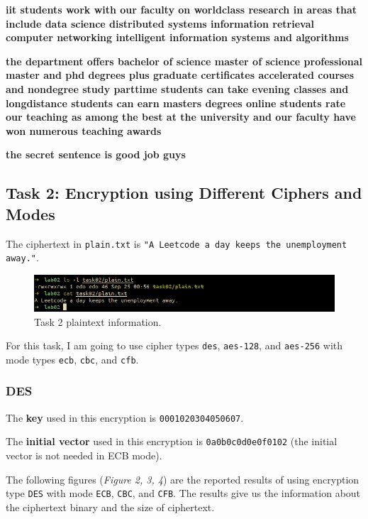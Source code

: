 \documentclass{article}
\begin{document}
\textbf{iit students work with our faculty on worldclass research in areas that include
data science distributed systems information retrieval computer networking
intelligent information systems and algorithms}

\textbf{the department offers bachelor of science master of science professional master
and phd degrees plus graduate certificates accelerated courses and nondegree
study parttime students can take evening classes and longdistance students can
earn masters degrees online students rate our teaching as among the best at the
university and our faculty have won numerous teaching awards}

\textbf{the secret sentence is good job guys}

\subsection{Task 2: Encryption using Different Ciphers and Modes}

The ciphertext in \texttt{plain.txt} is \texttt{"A Leetcode a day keeps the unemployment
away."}.

\begin{figure}[!ht]
    \centering
    \includegraphics[scale=0.68]{task02_plain.png}
    \caption{Task 2 plaintext information.}
\end{figure}

For this task, I am going to use cipher types \texttt{des}, \texttt{aes-128},
and \texttt{aes-256} with mode types \texttt{ecb}, \texttt{cbc}, and \texttt{cfb}.

\subsubsection{DES}

The \textbf{key} used in this encryption is \texttt{0001020304050607}.

The \textbf{initial vector} used in this encryption is \texttt{0a0b0c0d0e0f0102}
(the initial vector is not needed in ECB mode).

The following figures (\textit{Figure 2, 3, 4}) are the reported results of using
encryption type \texttt{DES} with mode \texttt{ECB}, \texttt{CBC}, and \texttt{CFB}.
The results give us the information about the ciphertext binary and the size of
ciphertext.
\end{document}
